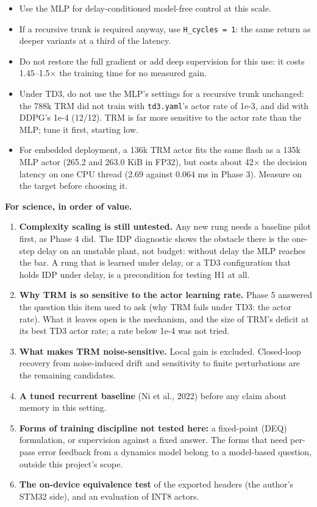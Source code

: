 \documentclass[11pt]{article}
\begin{document}
\begin{itemize}
\item Use the MLP for delay-conditioned model-free control at this scale.
\item If a recursive trunk is required anyway, use \texttt{H\_cycles = 1}: the same return as deeper variants at a third of the latency.
\item Do not restore the full gradient or add deep supervision for this use: it costs 1.45--1.5$\times$ the training time for no measured gain.
\item Under TD3, do not use the MLP's settings for a recursive trunk unchanged: the 788k TRM did not train with \texttt{td3.yaml}'s actor rate of 1e-3, and did with DDPG's 1e-4 (12/12). TRM is far more sensitive to the actor rate than the MLP; tune it first, starting low.
\item For embedded deployment, a 136k TRM actor fits the same flash as a 135k MLP actor (265.2 and 263.0 KiB in FP32), but costs about 42$\times$ the decision latency on one CPU thread (2.69 against 0.064 ms in Phase 3). Measure on the target before choosing it.
\end{itemize}



\textbf{For science, in order of value.}

\begin{enumerate}
\item \textbf{Complexity scaling is still untested.} Any new rung needs a baseline pilot first, as Phase 4 did. The IDP diagnostic shows the obstacle there is the one-step delay on an unstable plant, not budget: without delay the MLP reaches the bar. A rung that is learned under delay, or a TD3 configuration that holds IDP under delay, is a precondition for testing H1 at all.
\item \textbf{Why TRM is so sensitive to the actor learning rate.} Phase 5 answered the question this item used to ask (why TRM fails under TD3: the actor rate). What it leaves open is the mechanism, and the size of TRM's deficit at its best TD3 actor rate; a rate below 1e-4 was not tried.
\item \textbf{What makes TRM noise-sensitive.} Local gain is excluded. Closed-loop recovery from noise-induced drift and sensitivity to finite perturbations are the remaining candidates.
\item \textbf{A tuned recurrent baseline} (Ni et al., 2022) before any claim about memory in this setting.
\item \textbf{Forms of training discipline not tested here:} a fixed-point (DEQ) formulation, or supervision against a fixed answer. The forms that need per-pass error feedback from a dynamics model belong to a model-based question, outside this project's scope.
\item \textbf{The on-device equivalence test} of the exported headers (the author's STM32 side), and an evaluation of INT8 actors.
\end{enumerate}
\end{document}
